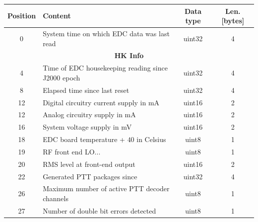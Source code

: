 \begin{table}[!ht]
	\centering
	\begin{tabular}{clcc}
		\toprule[1.5pt]
		\textbf{Position} & \textbf{Content}                                 & \textbf{Data type}& \textbf{Len. [bytes]}  \\
		\midrule                                                                                                         
		0                 & System time on which EDC data was last read      & uint32            & 4                      \\
		\midrule                                                                                                         
		\multicolumn{4}{c}{\textbf{HK Info}}                                                                              \\
		\midrule                                                                                                         
		4                 & Time of EDC housekeeping reading since J2000 epoch  & uint32            & 4                      \\
		8                 & Elapsed time since last reset                       & uint32            & 4                      \\
		12                & Digital circuitry current supply in mA              & uint16            & 2                      \\
		12                & Analog circuitry supply in mA                       & uint16            & 2                      \\
		16                & System voltage supply in mV                         & uint16            & 2                      \\
		18                & EDC board temperature + $40$ in Celsius               & uint8             & 1                      \\
		19                & RF front end LO...                                  & uint8             & 1                      \\
		20                & RMS level at front-end output                       & uint16            & 2                      \\
		22                & Generated PTT packages since                        & uint32            & 4                      \\
		26                & Maximum number of active PTT decoder channels       & uint8             & 1                      \\
		27                & Number of double bit errors detected                & uint8             & 1                      \\

\end{tabular}
\end{table}
